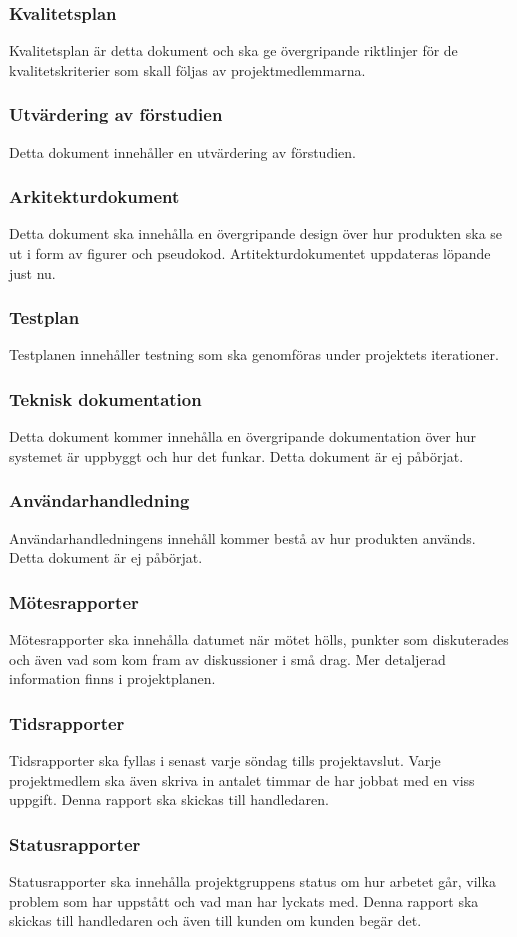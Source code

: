 \subsubsection{Kvalitetsplan}
Kvalitetsplan är detta dokument och ska ge övergripande riktlinjer för de kvalitetskriterier som skall följas av projektmedlemmarna.

\subsubsection{Utvärdering av förstudien}
Detta dokument innehåller en utvärdering av förstudien.

\subsubsection{Arkitekturdokument}
Detta dokument ska innehålla en övergripande design över hur produkten ska se ut i form av figurer och pseudokod. Artitekturdokumentet uppdateras löpande just nu.

\subsubsection{Testplan}
Testplanen innehåller testning som ska genomföras under projektets iterationer.

\subsubsection{Teknisk dokumentation}
Detta dokument kommer innehålla en övergripande dokumentation över hur systemet är uppbyggt och hur det funkar. Detta dokument är ej påbörjat. 

\subsubsection{Användarhandledning}
Användarhandledningens innehåll kommer bestå av hur produkten används. Detta dokument är ej påbörjat.

\subsubsection{Mötesrapporter}
Mötesrapporter ska innehålla datumet när mötet hölls, punkter som diskuterades och även vad som kom fram av diskussioner i små drag. Mer detaljerad information finns i projektplanen.

\subsubsection{Tidsrapporter}
Tidsrapporter ska fyllas i senast varje söndag tills projektavslut. Varje projektmedlem ska även skriva in antalet timmar de har jobbat med en viss uppgift. Denna rapport ska skickas till handledaren.

\subsubsection{Statusrapporter}
Statusrapporter ska innehålla projektgruppens status om hur arbetet går, vilka problem som har uppstått och vad man har lyckats med. Denna rapport ska skickas till handledaren och även till kunden om kunden begär det. 
